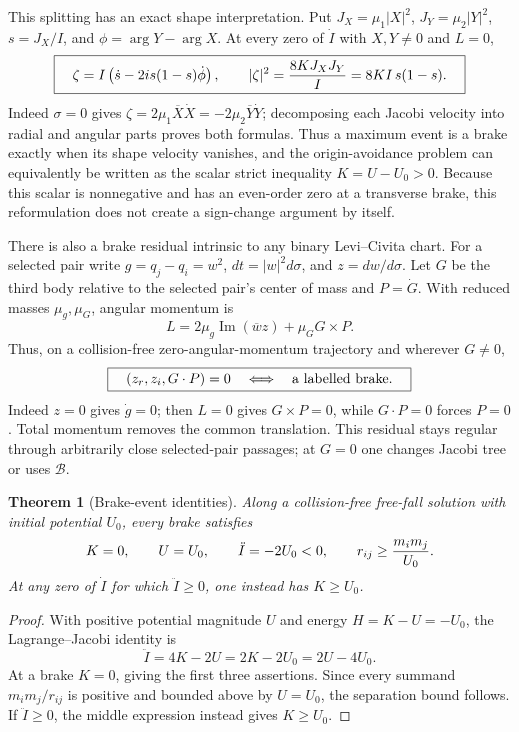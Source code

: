 \documentclass[11pt]{article}
\newtheorem{theorem}{Theorem}
\newcommand{\Bcal}{\mathcal B}
\begin{document}
This splitting has an exact shape interpretation.  Put
$J_X=\mu_1|X|^2$, $J_Y=\mu_2|Y|^2$, $s=J_X/I$, and
$\phi=\arg Y-\arg X$.  At every zero of $\dot I$ with $X,Y\ne0$ and $L=0$,
\[
 \boxed{\quad
 \zeta=I\left(\dot s-2is(1-s)\dot\phi\right),\qquad
 |\zeta|^2={8KJ_XJ_Y\over I}=8KI\,s(1-s).
 \quad}
\]
Indeed $\sigma=0$ gives
$\zeta=2\mu_1\overline X\dot X=-2\mu_2\overline Y\dot Y$; decomposing each
Jacobi velocity into radial and angular parts proves both formulas.  Thus a
maximum event is a brake exactly when its shape velocity vanishes, and the
origin-avoidance problem can equivalently be written as the scalar strict
inequality $K=U-U_0>0$.  Because this scalar is nonnegative and has an
even-order zero at a transverse brake, this reformulation does not create a
sign-change argument by itself.

There is also a brake residual intrinsic to any binary Levi--Civita chart.
For a selected pair write $g=q_j-q_i=w^2$, $dt=|w|^2d\sigma$, and
$z=dw/d\sigma$. Let $G$ be the third body relative to the selected pair's
center of mass and $P=\dot G$. With reduced masses $\mu_g,\mu_G$, angular
momentum is
\[
 L=2\mu_g\operatorname{Im}(\overline w z)+\mu_G G\times P.
\]
Thus, on a collision-free zero-angular-momentum trajectory and wherever
$G\ne0$,
\[
 \boxed{\quad (z_r,z_i,G\cdot P)=0
 \quad\Longleftrightarrow\quad\hbox{a labelled brake}.\quad}
\]
Indeed $z=0$ gives $\dot g=0$; then $L=0$ gives $G\times P=0$, while
$G\cdot P=0$ forces $P=0$. Total momentum removes the common translation.
This residual stays regular through arbitrarily close selected-pair
passages; at $G=0$ one changes Jacobi tree or uses $\Bcal$.

\begin{theorem}[Brake-event identities]
Along a collision-free free-fall solution with initial potential $U_0$, every
brake satisfies
\[
 K=0,\qquad U=U_0,\qquad \ddot I=-2U_0<0,
 \qquad r_{ij}\geq {m_im_j\over U_0}.
\]
At any zero of $\dot I$ for which $\ddot I\geq0$, one instead has
$K\geq U_0$.
\end{theorem}
\begin{proof}
With positive potential magnitude $U$ and energy $H=K-U=-U_0$, the
Lagrange--Jacobi identity is
\[
 \ddot I=4K-2U=2K-2U_0=2U-4U_0.
\]
At a brake $K=0$, giving the first three assertions.  Since every summand
$m_im_j/r_{ij}$ is positive and bounded above by $U=U_0$, the separation
bound follows.  If $\ddot I\geq0$, the middle expression instead gives
$K\geq U_0$.
\end{proof}
\end{document}
